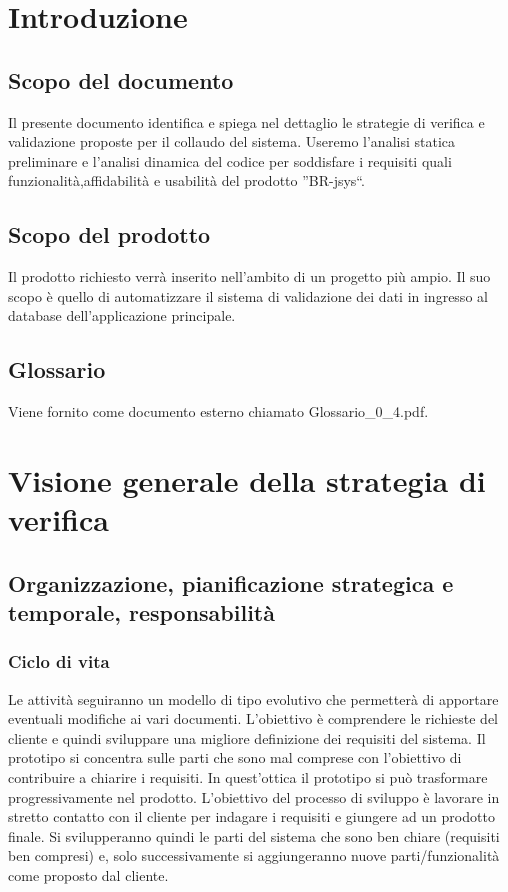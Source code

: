 \documentclass[11pt,titlepage,a4paper]{report}
\begin{document}
\tableofcontents	%

\chapter{Introduzione}
\section{Scopo del documento}
Il presente documento identifica e spiega nel dettaglio le strategie di verifica e validazione proposte per il collaudo del sistema. Useremo l'analisi statica preliminare e l'analisi dinamica del codice per soddisfare i requisiti quali funzionalit\`a,affidabilit\`a e usabilit\`a del prodotto ''BR-jsys``.

\section{Scopo del prodotto}
Il prodotto richiesto verr\`a inserito nell'ambito di un progetto pi\`u ampio. Il suo scopo \`e quello di automatizzare il sistema di validazione dei dati in ingresso al database dell'applicazione principale.

\section{Glossario}
Viene fornito come documento esterno chiamato Glossario\_0\_4.pdf.

\chapter[Strategia di verifica]{Visione generale della strategia di verifica}

\section[Organizzazione, pianificazione, responsabilit\`a]{Organizzazione, pianificazione strategica e temporale, responsabilit\`a}
\subsection{Ciclo di vita}
Le attivit\`a seguiranno un modello di tipo evolutivo che permetter\`a di apportare eventuali modifiche ai vari documenti. L'obiettivo \`e comprendere le richieste del cliente e quindi sviluppare una migliore definizione dei requisiti del sistema. Il prototipo si concentra sulle parti che sono mal comprese con l'obiettivo di contribuire a chiarire i requisiti. In quest'ottica il prototipo si pu\`o trasformare progressivamente nel prodotto. L'obiettivo del processo di sviluppo \`e lavorare in stretto contatto con il cliente per indagare i requisiti e giungere ad un prodotto finale. Si svilupperanno quindi le parti del sistema che sono ben chiare (requisiti ben compresi) e, solo successivamente si aggiungeranno nuove parti/funzionalit\`a come proposto dal cliente. 
\end{document}
